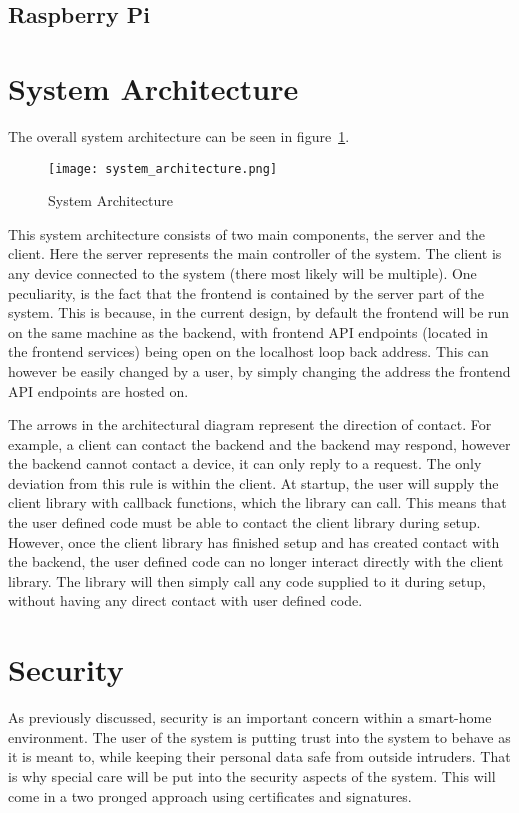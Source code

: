 \subsection{Raspberry Pi} \label{sec:chapdesign:technology:raspi}

\section{System Architecture} \label{sec:chapdesign:architecture}

The overall system architecture can be seen in figure~\ref{fig:system_architecture}.
\begin{figure}[h]
\caption{System Architecture}
\texttt{[image: system\_architecture.png]}
\label{fig:system_architecture}
\end{figure}
This system architecture consists of two main components, the server and the client. Here the server represents the main controller of the system. The client is any device connected to the system (there most likely will be multiple). One peculiarity, is the fact that the frontend is contained by the server part of the system. This is because, in the current design, by default the frontend will be run on the same machine as the backend, with frontend API endpoints (located in the frontend services) being open on the localhost loop back address. This can however be easily changed by a user, by simply changing the address the frontend API endpoints are hosted on.

The arrows in the architectural diagram represent the direction of contact. For example, a client can contact the backend and the backend may respond, however the backend cannot contact a device, it can only reply to a request. The only deviation from this rule is within the client. At startup, the user will supply the client library with callback functions, which the library can call. This means that the user defined code must be able to contact the client library during setup. However, once the client library has finished setup and has created contact with the backend, the user defined code can no longer interact directly with the client library. The library will then simply call any code supplied to it during setup, without having any direct contact with user defined code.

\section{Security} \label{sec:chapdesign:security}
As previously discussed, security is an important concern within a smart-home environment. The user of the system is putting trust into the system to behave as it is meant to, while keeping their personal data safe from outside intruders. That is why special care will be put into the security aspects of the system. This will come in a two pronged approach using certificates and signatures. 
